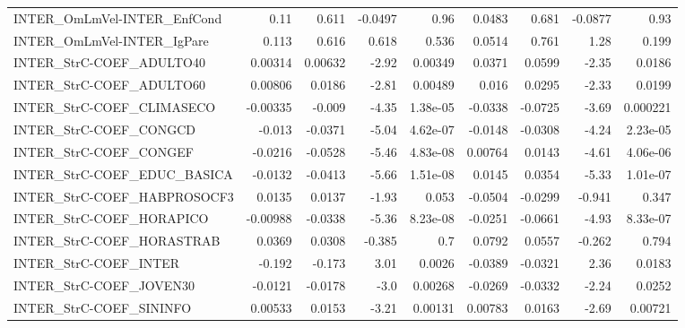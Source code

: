 \begin{tabular}{lrrrrrrrr}
INTER\_OmLmVel-INTER\_EnfCond            &        0.11 &        0.611 &  -0.0497 &     0.96 &     0.0483 &       0.681 &      -0.0877 &          0.93 \\
INTER\_OmLmVel-INTER\_IgPare             &       0.113 &        0.616 &    0.618 &    0.536 &     0.0514 &       0.761 &         1.28 &         0.199 \\
INTER\_StrC-COEF\_ADULTO40               &     0.00314 &      0.00632 &    -2.92 &  0.00349 &     0.0371 &      0.0599 &        -2.35 &        0.0186 \\
INTER\_StrC-COEF\_ADULTO60               &     0.00806 &       0.0186 &    -2.81 &  0.00489 &      0.016 &      0.0295 &        -2.33 &        0.0199 \\
INTER\_StrC-COEF\_CLIMASECO              &    -0.00335 &       -0.009 &    -4.35 & 1.38e-05 &    -0.0338 &     -0.0725 &        -3.69 &      0.000221 \\
INTER\_StrC-COEF\_CONGCD                 &      -0.013 &      -0.0371 &    -5.04 & 4.62e-07 &    -0.0148 &     -0.0308 &        -4.24 &      2.23e-05 \\
INTER\_StrC-COEF\_CONGEF                 &     -0.0216 &      -0.0528 &    -5.46 & 4.83e-08 &    0.00764 &      0.0143 &        -4.61 &      4.06e-06 \\
INTER\_StrC-COEF\_EDUC\_BASICA            &     -0.0132 &      -0.0413 &    -5.66 & 1.51e-08 &     0.0145 &      0.0354 &        -5.33 &      1.01e-07 \\
INTER\_StrC-COEF\_HABPROSOCF3            &      0.0135 &       0.0137 &    -1.93 &    0.053 &    -0.0504 &     -0.0299 &       -0.941 &         0.347 \\
INTER\_StrC-COEF\_HORAPICO               &    -0.00988 &      -0.0338 &    -5.36 & 8.23e-08 &    -0.0251 &     -0.0661 &        -4.93 &      8.33e-07 \\
INTER\_StrC-COEF\_HORASTRAB              &      0.0369 &       0.0308 &   -0.385 &      0.7 &     0.0792 &      0.0557 &       -0.262 &         0.794 \\
INTER\_StrC-COEF\_INTER                  &      -0.192 &       -0.173 &     3.01 &   0.0026 &    -0.0389 &     -0.0321 &         2.36 &        0.0183 \\
INTER\_StrC-COEF\_JOVEN30                &     -0.0121 &      -0.0178 &     -3.0 &  0.00268 &    -0.0269 &     -0.0332 &        -2.24 &        0.0252 \\
INTER\_StrC-COEF\_SININFO                &     0.00533 &       0.0153 &    -3.21 &  0.00131 &    0.00783 &      0.0163 &        -2.69 &       0.00721 \\

\end{tabular}
